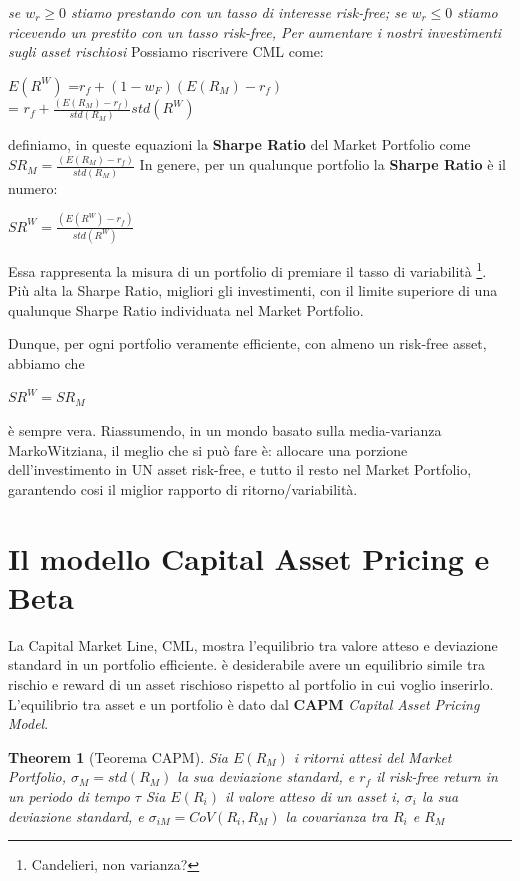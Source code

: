\documentclass[a4paper,11pt]{report}
\newtheorem{theorem}{Theorem}
\begin{document}
{	\emph{ se $w_r \geq 0 $ stiamo prestando con un tasso di interesse risk-free; se $w_r \leq 0 $ stiamo ricevendo un prestito 
	con un tasso risk-free, Per aumentare i nostri investimenti sugli asset rischiosi }
	 \newline
	Possiamo riscrivere CML come:
\begin{center}
	$E(R^W)$ =$ r_f+(1-w_F)(E(R_M)-r_f)$ \\
	 = $r_f+{\frac{(E(R_M)-r_f)}{std(R_M)}}std(R^W)$
\end{center}
 	definiamo, in queste equazioni la \textbf{Sharpe Ratio} del Market Portfolio come $SR_M={\frac{(E(R_M)-r_f)}{std(R_M)}}$  \newline
	In genere, per un qualunque portfolio la \textbf{Sharpe Ratio} è il numero:
\begin{center}
	$SR^W={\frac{(E(R^W)-r_f)}{std(R^W)}}$
\end{center}
	Essa rappresenta la misura di un portfolio di premiare il tasso di variabilità \footnote{Candelieri, non varianza?}. \newline
	Più alta la Sharpe Ratio, migliori gli investimenti, con il limite superiore di una qualunque Sharpe Ratio individuata nel Market 
	Portfolio. 

	Dunque, per ogni portfolio veramente efficiente, con almeno un risk-free asset, abbiamo che 
\begin{center}
	$SR^W = SR_M$
\end{center}
	è sempre vera.  \newline
	Riassumendo, in un mondo basato sulla media-varianza MarkoWitziana, il meglio che si può fare è: \newline
	 allocare  una porzione dell'investimento in UN  asset risk-free, e tutto il resto nel Market Portfolio, \newline
	garantendo cosi il miglior rapporto di ritorno/variabilità. 

\newpage
\section{Il modello Capital Asset Pricing e Beta}
	La Capital Market Line, CML, mostra l'equilibrio tra valore atteso e deviazione standard in un portfolio efficiente. \newline
	è desiderabile avere un equilibrio simile tra rischio e reward di un asset rischioso rispetto al portfolio in cui voglio inserirlo. \newline
	L'equilibrio tra asset e un portfolio è dato dal \textbf{CAPM} \emph{Capital Asset Pricing Model}.
\begin{theorem}[Teorema CAPM]
	Sia $E(R_M)$ i ritorni attesi del \emph{Market Portfolio}, $\sigma_M = std(R_M)$ la sua deviazione standard, e $r_f$ il risk-free return in un periodo di tempo $\tau$ \newline
	Sia $E(R_i)$ il valore atteso di un asset i, $\sigma_i$ la sua deviazione standard, e $\sigma_{iM}=CoV(R_i,R_M)$ la covarianza tra $R_i$ e $R_M$


\end{theorem}}
\end{document}
